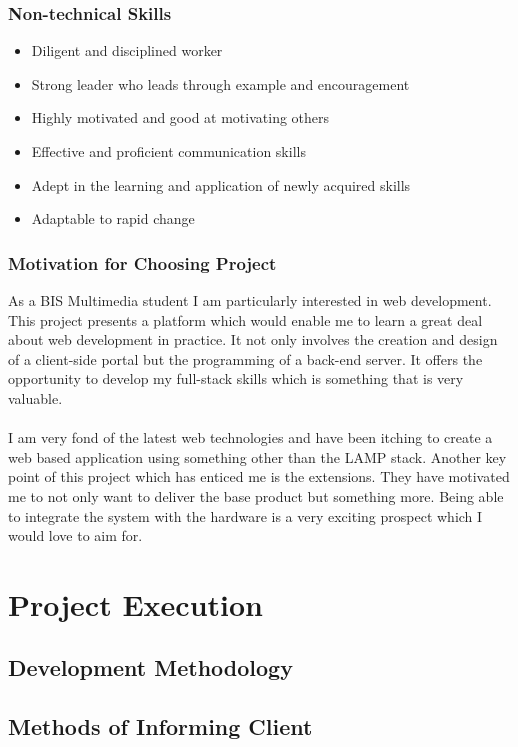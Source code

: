 \documentclass{article}
\begin{document}
\subsubsection{Non-technical Skills}
\begin{itemize}
	\item Diligent and disciplined worker
	\item Strong leader who leads through example and encouragement
	\item Highly motivated and good at motivating others
	\item Effective and proficient communication skills
	\item Adept in the learning and application of newly acquired skills
	\item Adaptable to rapid change
\end{itemize}
\subsubsection{Motivation for Choosing Project}
As a BIS Multimedia student I am particularly interested in web development. This project presents a platform which would enable me to learn a great deal about web development in practice. It not only involves the creation and design of a client-side portal but the programming of a back-end server. It offers the opportunity to develop my full-stack skills which is something that is very valuable.\\\\
I am very fond of the latest web technologies and have been itching to create a web based application using something other than the LAMP stack. Another key point of this project which has enticed me is the extensions. They have motivated me to not only want to deliver the base product but something more. Being able to integrate the system with the hardware is a very exciting prospect which I would love to aim for.

\cleardoublepage
    
\section{Project Execution}
	\subsection{Development Methodology}
		
	\subsection{Methods of Informing Client}
		
\end{document}
